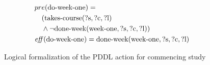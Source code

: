 \begin{figure}[t]
    \begin{align*}
    &pre(\text{do-week-one}) = \\
    &\quad ( \text{takes-course}(\text{?s}, \text{?c}, \text{?l}) \\
    &\quad \land \lnot \text{done-week}(\text{week-one}, \text{?s}, \text{?c}, \text{?l}) ) \\
    &\mathit{eff}(\text{do-week-one}) = \text{done-week}(\text{week-one}, \text{?s}, \text{?c}, \text{?l})
    \end{align*}
    \caption{Logical formalization of the PDDL action for commencing study}\label{fig:formalised-do-week-one}
\end{figure}